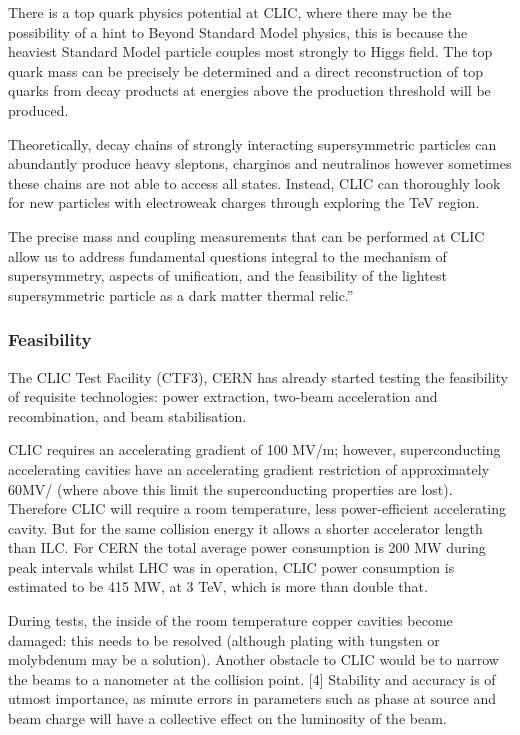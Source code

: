 There is a top quark physics potential at CLIC, where there may be the possibility of a hint to Beyond Standard Model physics, this is because the heaviest Standard Model particle couples most strongly to Higgs field. The top quark mass can be precisely be determined and a direct reconstruction of top quarks from decay products at energies above the production threshold will be produced.
 
Theoretically, decay chains of strongly interacting supersymmetric particles can abundantly produce heavy sleptons, charginos and neutralinos however sometimes these chains are not able to access all states. Instead, CLIC can thoroughly look for new particles with electroweak charges through exploring the TeV region. \cite{CLIC:Concept}

The precise mass and coupling measurements that can be performed at CLIC allow us to address fundamental questions integral to the mechanism of supersymmetry, aspects of unification, and the feasibility of the lightest supersymmetric particle as a dark matter thermal relic.” \cite{CLIC:Concept}
 
\subsubsection{Feasibility}

The CLIC Test Facility (CTF3), CERN has already started testing the feasibility of requisite technologies: power extraction, two-beam acceleration and recombination, and beam stabilisation. \cite{CLIC:DriveBeam}

CLIC requires an accelerating gradient of 100 MV/m; however, superconducting accelerating cavities have an accelerating gradient restriction of approximately 60MV/ (where above this limit the superconducting properties are lost). Therefore CLIC will require a room temperature, less power-efficient accelerating cavity. But for the same collision energy it allows a shorter accelerator length than ILC. For CERN the total average power consumption is 200 MW during peak intervals whilst LHC was in operation, CLIC power consumption is estimated to be 415 MW, at 3 TeV, which is more than double that.\cite{CERN:Powering}

During tests, the inside of the room temperature copper cavities become damaged: this needs to be resolved (although plating with tungsten or molybdenum may be a solution). Another obstacle to CLIC would be to narrow the beams to a nanometer at the collision point. [4] Stability and accuracy is of utmost importance, as minute errors in parameters such as phase at source and beam charge will have a collective effect on the luminosity of the beam. \cite{CLIC:DriveBeam}

